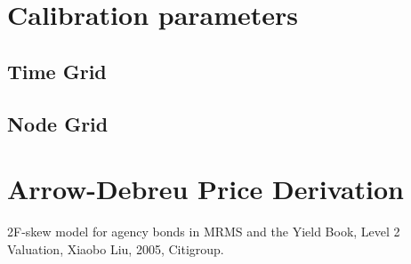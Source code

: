 \documentclass{texyise}
\begin{document}
\section{Calibration parameters}

\subsection{Time Grid}
\label{S:time-grid}

\subsection{Node Grid}
\label{S:node-grid}

\appendix

\section{Arrow-Debreu Price Derivation}
\label{S:arrow-debreu}

\begin{thebibliography}{}
    
     2F-skew model for agency bonds in MRMS and the Yield Book, Level 2 Valuation, Xiaobo Liu, 2005, Citigroup.

\end{thebibliography}
\end{document}
